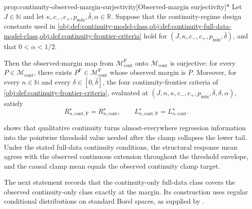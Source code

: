 \documentclass[11pt]{article}
\begin{document}
\begin{propositionv}{prop:continuity-observed-margin-surjectivity}[Observed-margin surjectivity]*
Let \(J\in\mathbb N\) and let \(\kappa,c_-,c_+,p_{\min},\bar\delta,\alpha\in\mathbb R\). Suppose that the continuity-regime design constants used in \cref{obj:def:continuity-model-class,obj:def:continuity-full-data-model-class,obj:def:continuity-frontier-criteria} hold for \((J,\kappa,c_-,c_+,p_{\min},\bar\delta)\), and that \(0<\alpha<1/2\).

Then the observed-margin map from \(\mathcal M_{\mathrm{cont}}^{\mathrm F}\) onto \(\mathcal M_{\mathrm{cont}}\) is surjective: for every \(P\in\mathcal M_{\mathrm{cont}}\), there exists \(P^{\mathrm F}\in\mathcal M_{\mathrm{cont}}^{\mathrm F}\) whose observed margin is \(P\). Moreover, for every \(n\in\mathbb N\) and every \(\delta\in[0,\bar\delta]\), the four continuity-frontier criteria of \cref{obj:def:continuity-frontier-criteria}, evaluated at \((J,n,\kappa,c_-,c_+,p_{\min},\bar\delta,\delta,\alpha)\), satisfy
\[
R_{n,\mathrm{cont},\mathrm F}^\star
=
R_{n,\mathrm{cont}}^\star,
\qquad
L_{n,\mathrm{cont},\mathrm F}^\star
=
L_{n,\mathrm{cont}}^\star .
\]
\end{propositionv}

 shows that qualitative continuity turns almost-everywhere regression information into the pointwise threshold value needed after the clamp collapses the lower tail. Under the stated full-data continuity conditions, the structural response mean agrees with the observed continuous extension throughout the threshold envelope, and the causal clamp mean equals the observed continuity clamp target.

The next statement records that the continuity-only full-data class covers the observed continuity-only class exactly at the margin. Its construction uses regular conditional distributions on standard Borel spaces, as supplied by \citet[Theorem~6.3]{Kallenberg2002Foundations}.
\end{document}
